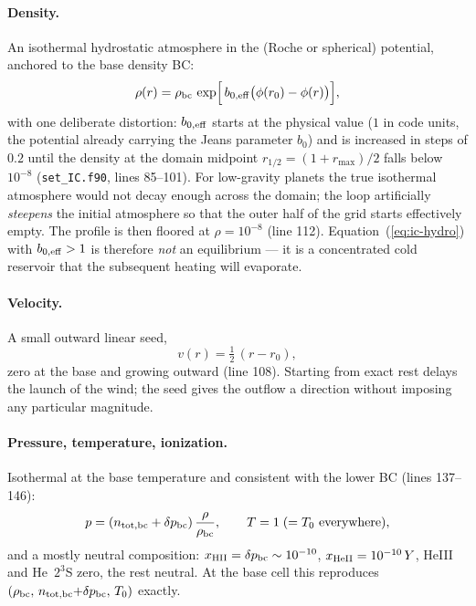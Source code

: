 \documentclass[english,a4paper]{kiseon_memo}
\begin{document}
\paragraph{Density.}
An isothermal hydrostatic atmosphere in the (Roche or spherical)
potential, anchored to the base density BC:
\begin{equation}
\rho(r) = \rho_{\rm bc}\,
   \exp\!\Big[\, b_{0,\rm eff}\big(\phi(r_0) - \phi(r)\big) \Big],
\label{eq:ic-hydro}
\end{equation}
with one deliberate distortion: $b_{0,\rm eff}$ starts at the physical
value ($1$ in code units, the potential already carrying the Jeans
parameter $b_0$) and is increased in steps of $0.2$ until the density
at the domain midpoint $r_{1/2} = (1 + r_{\max})/2$ falls below
$10^{-8}$ (\texttt{set\_IC.f90}, lines 85--101). For low-gravity
planets the true isothermal atmosphere would not decay enough across
the domain; the loop artificially \emph{steepens} the initial
atmosphere so that the outer half of the grid starts effectively
empty. The profile is then floored at $\rho = 10^{-8}$ (line 112).
Equation~(\ref{eq:ic-hydro}) with $b_{0,\rm eff} > 1$ is therefore
\emph{not} an equilibrium --- it is a concentrated cold reservoir that
the subsequent heating will evaporate.

\paragraph{Velocity.}
A small outward linear seed,
\begin{equation}
v(r) = \tfrac12\,(r - r_0),
\end{equation}
zero at the base and growing outward (line 108). Starting from exact
rest delays the launch of the wind; the seed gives the outflow a
direction without imposing any particular magnitude.

\paragraph{Pressure, temperature, ionization.}
Isothermal at the base temperature and consistent with the lower BC
(lines 137--146):
\begin{equation}
p = (n_{\rm tot,bc} + \delta p_{\rm bc})\,\frac{\rho}{\rho_{\rm bc}}, \qquad
T = 1 \;(= T_0\ \mbox{everywhere}),
\end{equation}
and a mostly neutral composition: $x_{\rm HII} = \delta p_{\rm bc}
\sim 10^{-10}$, $x_{\rm HeII} = 10^{-10}\,Y$, HeIII and He~$2^3$S
zero, the rest neutral. At the base cell this reproduces
$(\rho_{\rm bc},\, n_{\rm tot,bc}{+}\delta p_{\rm bc},\, T_0)$ exactly.
\end{document}
